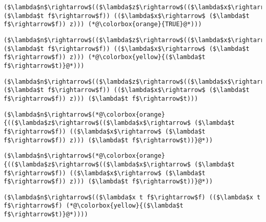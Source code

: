 \documentclass{beamer}
\begin{document}
\begin{frame}[fragile]{\CurrentSection}
\lstset{basicstyle=\ttfamily\small}\lstset{numbers=none}\lstset{language=ML}\begin{lstlisting}
($\lambda$n$\rightarrow$(($\lambda$z$\rightarrow$(($\lambda$x$\rightarrow$ ($\lambda$t f$\rightarrow$f)) (($\lambda$x$\rightarrow$ ($\lambda$t f$\rightarrow$f)) z))) (*@\colorbox{orange}{TRUE}@*)))
\end{lstlisting}
\pause\lstset{language=ML}\begin{lstlisting}
($\lambda$n$\rightarrow$(($\lambda$z$\rightarrow$(($\lambda$x$\rightarrow$ ($\lambda$t f$\rightarrow$f)) (($\lambda$x$\rightarrow$ ($\lambda$t f$\rightarrow$f)) z))) (*@\colorbox{yellow}{($\lambda$t f$\rightarrow$t)}@*)))
\end{lstlisting}

\end{frame}

\begin{frame}[fragile]{\CurrentSection}
\lstset{basicstyle=\ttfamily\small}\lstset{numbers=none}\lstset{language=ML}\begin{lstlisting}
($\lambda$n$\rightarrow$(($\lambda$z$\rightarrow$(($\lambda$x$\rightarrow$ ($\lambda$t f$\rightarrow$f)) (($\lambda$x$\rightarrow$ ($\lambda$t f$\rightarrow$f)) z))) ($\lambda$t f$\rightarrow$t)))
\end{lstlisting}
\pause\lstset{language=ML}\begin{lstlisting}
($\lambda$n$\rightarrow$(*@\colorbox{orange}{(($\lambda$z$\rightarrow$(($\lambda$x$\rightarrow$ ($\lambda$t f$\rightarrow$f)) (($\lambda$x$\rightarrow$ ($\lambda$t f$\rightarrow$f)) z))) ($\lambda$t f$\rightarrow$t))}@*))
\end{lstlisting}

\end{frame}

\begin{frame}[fragile]{\CurrentSection}
\lstset{basicstyle=\ttfamily\small}\lstset{numbers=none}\lstset{language=ML}\begin{lstlisting}
($\lambda$n$\rightarrow$(*@\colorbox{orange}{(($\lambda$z$\rightarrow$(($\lambda$x$\rightarrow$ ($\lambda$t f$\rightarrow$f)) (($\lambda$x$\rightarrow$ ($\lambda$t f$\rightarrow$f)) z))) ($\lambda$t f$\rightarrow$t))}@*))
\end{lstlisting}
\pause\lstset{language=ML}\begin{lstlisting}
($\lambda$n$\rightarrow$(($\lambda$x t f$\rightarrow$f) (($\lambda$x t f$\rightarrow$f) (*@\colorbox{yellow}{($\lambda$t f$\rightarrow$t)}@*))))
\end{lstlisting}

\end{frame}
\end{document}
